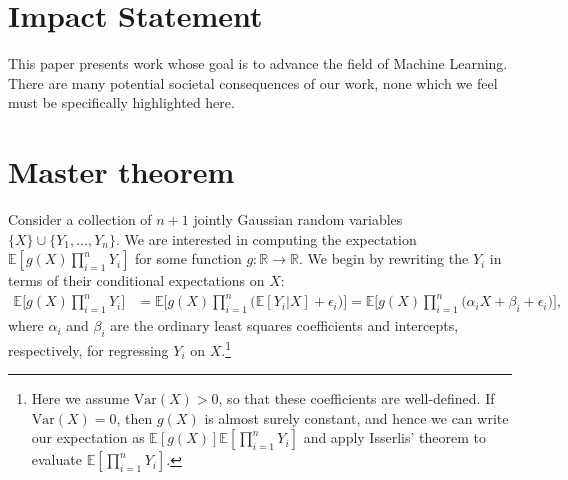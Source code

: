 \documentclass{article}
\theoremstyle{plain}
\theoremstyle{definition}
\theoremstyle{remark}
\newcommand{\E}{\mathbb{E}}
\newcommand{\R}{\mathbb{R}}
\begin{document}
\section*{Impact Statement}

This paper presents work whose goal is to advance the field of 
Machine Learning. There are many potential societal consequences 
of our work, none which we feel must be specifically highlighted here.


\nocite{langley00}





\newpage
\appendix
\onecolumn
\section{Master theorem}

Consider a collection of $n + 1$ jointly Gaussian random variables $\{ X \} \cup \{ Y_1, \ldots, Y_n \}$. We are interested in computing the expectation $\E[g(X) \prod_{i = 1}^{n} Y_i]$ for some function $g : \R \rightarrow \R$. We begin by rewriting the $Y_i$ in terms of their conditional expectations on $X$:
\begin{align}\label{eq:setup}
    \E \Big [g(X) \prod_{i = 1}^{n} Y_i \Big ] &= \E \Big [ g(X) \prod_{i = 1}^{n} \big ( \E[Y_i | X] + \epsilon_i \big ) \Big ] = \E \Big [ g(X) \prod_{i = 1}^{n} \big ( \alpha_i X + \beta_i + \epsilon_i \big ) \Big ],
\end{align}
where $\alpha_i$ and $\beta_i$ are the ordinary least squares coefficients and intercepts, respectively, for regressing $Y_i$ on $X$.\footnote{Here we assume $\mathrm{Var}(X) > 0$, so that these coefficients are well-defined. If $\mathrm{Var}(X) = 0$, then $g(X)$ is almost surely constant, and hence we can write our expectation as $\E[g(X)] \E[\prod_{i = 1}^{n} Y_i]$ and apply Isserlis' theorem to evaluate $\E[\prod_{i = 1}^{n} Y_i]$.}
\end{document}
